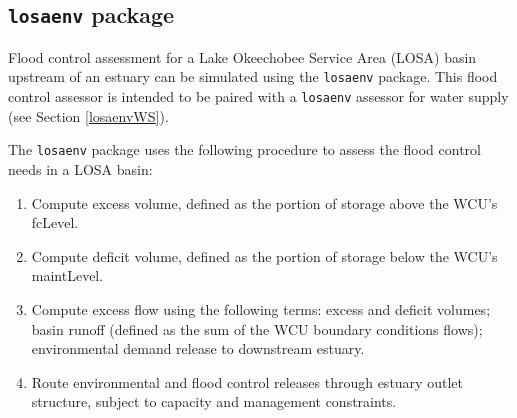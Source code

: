 \subsection{{\tt losaenv} package }\label{losaenvFC}

Flood control assessment for a Lake Okeechobee Service Area (LOSA)
basin upstream of an estuary can be simulated using the {\tt losaenv}
package. This flood control assessor is intended to be paired with a
{\tt losaenv} assessor for water supply (see Section
\ref{losaenvWS}).

The {\tt losaenv} package uses the following procedure to assess the
flood control needs in a LOSA basin:

\begin{enumerate}

 \item Compute excess volume, defined as the portion of storage
   above the WCU's fcLevel.

 \item Compute deficit volume, defined as the portion of storage below
   the WCU's maintLevel.

 \item Compute excess flow using the following terms: excess and
   deficit volumes; basin runoff (defined as the sum of the WCU
   boundary conditions flows); environmental demand release to
   downstream estuary.

 \item Route environmental and flood control releases through estuary
   outlet structure, subject to capacity and management constraints.

\end{enumerate}

